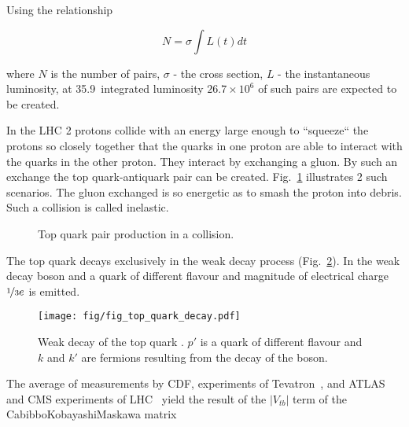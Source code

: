 Using the relationship

\begin{equation}
N=\sigma\int L(t)dt
\end{equation}

\noindent where $N$ is the number of \ttbar pairs, $\sigma$ - the \ttbar cross section, $L$ - the instantaneous luminosity, at 35.9~\fbinv integrated luminosity $26.7\times10^{6}$ of such pairs are expected to be created. 

In the LHC 2 protons collide with an energy large enough to ``squeeze`` the protons so closely together that the quarks in one proton are able to interact with the quarks in the other proton. They interact by exchanging a gluon. By such an exchange the top quark-antiquark pair can be created. Fig.~\ref{fig:top_quark_productions} illustrates 2 such scenarios. The gluon exchanged is so energetic as to smash the proton into debris. Such a collision is called inelastic.

\begin{figure}[h!]
  \centering
  \def\twidth{0.45}
  \hfil
  \caption{Top quark pair production in a \Pp\Pp collision.}
  \label{fig:top_quark_productions}
\end{figure}

The top quark decays exclusively in the weak decay process (Fig.~\ref{fig:quark_decay}). In the weak decay \PW boson and a quark of different flavour and magnitude of electrical charge $\nicefrac{1}{3}e$ is emitted. 

\begin{figure}[H]
  \centering
  \texttt{[image: fig/fig\_top\_quark\_decay.pdf]}
  \caption{Weak decay of the top quark \cPqt. $p'$ is a quark of different flavour and $k$ and $k'$ are fermions resulting from the decay of the \PW boson.}
  \label{fig:quark_decay}
\end{figure}

The average of measurements by CDF, \DZERO experiments of Tevatron~\cite{Aaltonen:2015cra}, and ATLAS and CMS experiments of LHC~\cite{twiki:tt_curve_toplhcwg_sep18} yield the result of the $|V_{tb}|$ term of the Cabibbo\textendash Kobayashi\textendash Maskawa matrix

